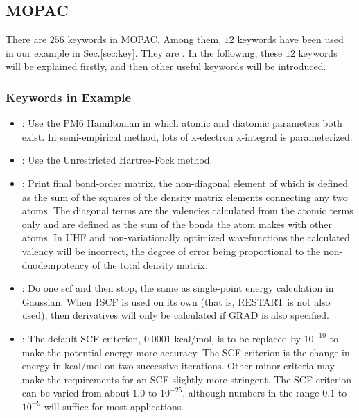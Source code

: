 \documentclass[11pt]{JHEP3}
\begin{document}
\subsection{MOPAC}\label{sec:mopac}
There are $256$ keywords in MOPAC. Among them, $12$ keywords have
been used in our example in Sec.\ref{sec:key}. They are . In the following, these $12$ keywords will
be explained firstly, and then other useful keywords will be
introduced.

\subsubsection*{Keywords in Example}
\begin{itemize}

\item {}: Use the PM6 Hamiltonian in which atomic and diatomic parameters both
exist. In semi-empirical method, lots of x-electron x-integral is
parameterized.

\item {}: Use the Unrestricted Hartree-Fock method.

\item {}: Print final bond-order matrix, the non-diagonal element of which is defined as the sum of
the squares of the density matrix elements connecting any two atoms.
The diagonal terms are the valencies calculated from the atomic
terms only and are defined as the sum of the bonds the atom makes
with other atoms. In UHF and non-variationally optimized
wavefunctions the calculated valency will be incorrect, the degree
of error being proportional to the non-duodempotency of the total
density matrix.

\item {}: Do one scf and then stop, the same as single-point
energy calculation in Gaussian. When 1SCF is used on its own (that
is, RESTART is not also used), then derivatives will only be
calculated if GRAD is also specified.

\item {}: The default SCF criterion, $0.0001$ kcal/mol,
is to be replaced by $10^{-10}$ to make the potential energy more
accuracy. The SCF criterion is the change in energy in kcal/mol on
two successive iterations. Other minor criteria may make the
requirements for an SCF slightly more stringent. The SCF criterion
can be varied from about $1.0$ to $10^{-25}$, although numbers in
the range $0.1$ to $10^{-9}$ will suffice for most applications.


\end{itemize}
\end{document}
